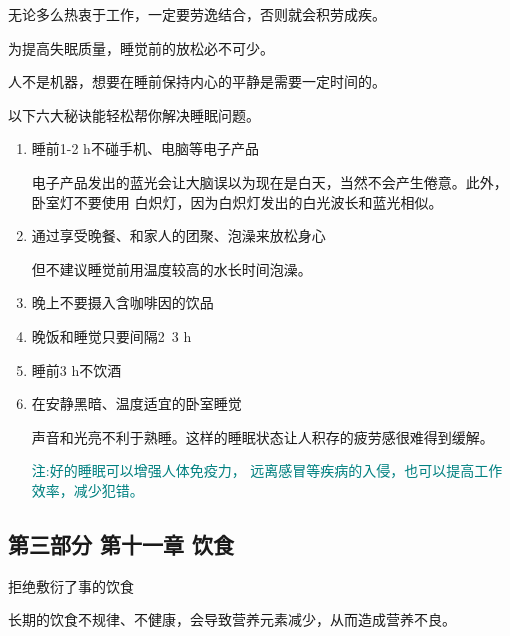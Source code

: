 \documentclass[12pt,a4paper]{article}
\begin{document}
无论多么热衷于工作，一定要劳逸结合，否则就会积劳成疾。

{\centering {\Large {\kaishu \textcolor{gray}{调理睡眠十分重要，六大法宝轻松解决}}}\par}


为提高失眠质量，睡觉前的放松必不可少。

人不是机器，想要在睡前保持内心的平静是需要一定时间的。

以下六大秘诀能轻松帮你解决睡眠问题。

\begin{enumerate}
    \item 睡前1-2 h不碰手机、电脑等电子产品
    
    电子产品发出的蓝光会让大脑误以为现在是白天，当然不会产生倦意。此外，卧室灯不要使用
    白炽灯，因为白炽灯发出的白光波长和蓝光相似。

    \item 通过享受晚餐、和家人的团聚、泡澡来放松身心
    
    但不建议睡觉前用温度较高的水长时间泡澡。

    \item 晚上不要摄入含咖啡因的饮品
    
    \item 晚饭和睡觉只要间隔2~3 h
    
    \item 睡前3 h不饮酒
    
    \item 在安静黑暗、温度适宜的卧室睡觉
    
    声音和光亮不利于熟睡。这样的睡眠状态让人积存的疲劳感很难得到缓解。

    \footnotesize \textcolor{teal}{注:好的睡眠可以增强人体免疫力，
    远离感冒等疾病的入侵，也可以提高工作效率，减少犯错。}

\end{enumerate}





\subsection*{第三部分 第十一章 饮食 }

{\centering {\Large {\kaishu \textcolor{gray}{每顿饭都草草了事的话，和以缓解疲劳？}}}\par}

拒绝敷衍了事的饮食

长期的饮食不规律、不健康，会导致营养元素减少，从而造成营养不良。
\end{document}
